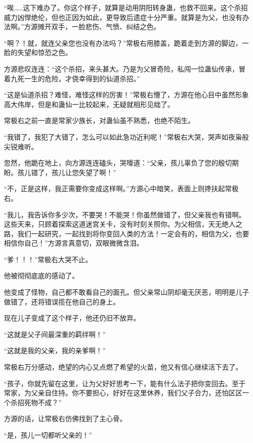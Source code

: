 \begin{this_body}
“唉……这下难办了。你这个样子，就算是动用阴阳转身蛊，也救不回来。这个杀招威力凶悍绝伦，但也正因为如此，更导致后遗症十分严重。就算是为父，也没有办法啊。”方源摊开双手，一脸悲伤、气愤、纠结之色。

“啊？！就，就连父亲您也没有办法吗？”常极右用膝盖，跪着走到方源的脚边，一脸的失望和惊恐之色。

方源悲叹连连：“这个杀招，来头甚大。乃是为父冒奇险，私闯一位蛊仙传承，冒着九死一生的危险，才侥幸得到的仙道杀招。”

“这是仙道杀招？难怪，难怪这样的厉害！”常极右懵了，方源在他心目中虽然形象高大伟岸，但是和蛊仙一比较起来，无疑就相形见绌了。

常极右之前一直是常家少族长，对蛊仙虽不熟悉，也绝不陌生。

“我错了，我犯了大错了，怎么可以如此急功近利呢！”常极右大哭，哭声如夜枭般尖锐难听。

忽然，他跪在地上，向方源连连磕头，哭嚎道：“父亲，孩儿辜负了您的殷切期盼。孩儿错了，孩儿让您失望了啊！”

“不，正是这样，我正需要你变成这样啊。”方源心中暗笑，表面上则搀扶起常极右。

“我儿，我告诉你多少次，不要哭！不能哭！你虽然做错了，但父亲我也有错啊。这些天来，只顾着探索这道迷宫关卡，没有时刻关照你。为父相信，天无绝人之路，我们一起研究，一起找到将你变回人类的方法！一定会有的，相信为父，也要相信你自己！”方源言真意切，双眼微微含泪。

“爹！！！”常极右大哭不止。

他被彻彻底底的感动了。

他变成了怪物，自己都不敢看自己的面孔。但父亲常山阴却毫无厌恶，明明是儿子做错了，还将错误揽在他自己的身上。

现在儿子变成了这个样子，他还仍旧不放弃。

“这就是父子间最深重的羁绊啊！”

“这就是我的父亲，我的亲爹啊！”

常极右万分感动，绝望的内心又点燃了希望的火苗，他又有信心继续活下去了。

“孩子，你就先留在这里，让为父好好思考一下，能有什么法子把你变回去。至于常家，为父亲自住持。你不要担心，好好在这里休养，我们父子合力，还怕区区一个杀招死物不成？”

方源的话，让常极右仿佛找到了主心骨。

“是，孩儿一切都听父亲的！”

\end{this_body}

